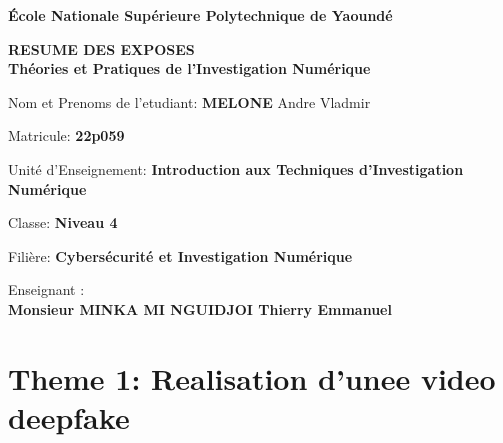\documentclass[12pt]{article}
\begin{document}
\begin{titlepage}
    \centering
    \vspace*{1cm}
    {\Huge\bfseries École Nationale Supérieure Polytechnique de Yaoundé \par}
    \vspace{1.5cm}
    {\Huge\bfseries RESUME DES EXPOSES \\ Théories et Pratiques de l'Investigation Numérique \par}
    \vspace{1.5cm}
    {\Large Nom et Prenoms de l'etudiant: \textbf{MELONE} Andre Vladmir \par}
    \vspace{0.5cm}
    {\large Matricule: \textbf{22p059} \par}
    \vspace{0.5cm}
    {\large Unité d'Enseignement: \textbf{Introduction aux Techniques d'Investigation Numérique} \par}
    \vspace{0.5cm}
    {\large Classe:\textbf{ Niveau 4} \par}
    \vspace{0.5cm}
    {\large Filière: \textbf{Cybersécurité et Investigation Numérique} \par}
    \vspace{2cm}
    {\large Enseignant : \\ \textbf{Monsieur MINKA MI NGUIDJOI Thierry Emmanuel} \par}
    \vspace{1cm}

\end{titlepage}


\newpage
\tableofcontents
\newpage

\section{Theme 1: Realisation d'unee video deepfake  }
\end{document}
